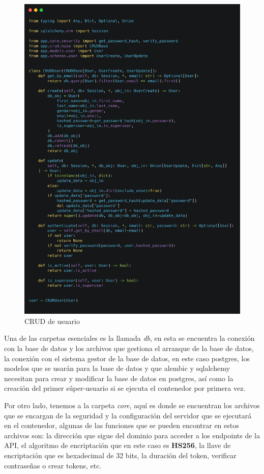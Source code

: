 \begin{figure}[!htb]
    \centering
    \includegraphics[scale=.10]{TT/img/implementacion/crud_user.png}
    \caption{CRUD de usuario}
    \label{graphic:user_crud}    
\end{figure}

Una de las carpetas esenciales es la llamada \textit{db}, en esta se encuentra la conexión con la base de datos y los archivos que gestiona el arranque de la base de datos, la conexión con el sistema gestor de la base de datos, en este caso postgres, los modelos que se usarán para la base de datos y que alembic y sqlalchemy necesitan para crear y modificar la base de datos en postgres, así como la creación del primer súper-usuario si se ejecuta el contenedor por primera vez.

Por otro lado, tenemos a la carpeta \textit{core}, aquí es donde se encuentran los archivos que se encargan de la seguridad y la configuración del servidor que se ejecutará en el contenedor, algunas de las funciones que se pueden encontrar en estos archivos son: la dirección que sigue del dominio para acceder a los endpoints de la API, el algoritmo de encriptación que en este caso es \textbf{HS256}, la llave de encriptación que es hexadecimal de 32 bits, la duración del token, verificar contraseñas o crear tokens, etc.

